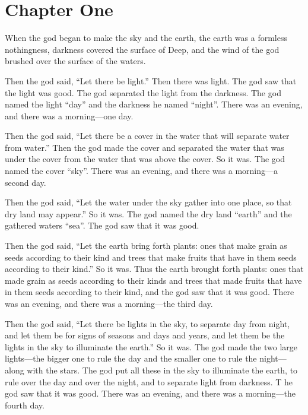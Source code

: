 \chapter*{Chapter One}

When the god began to make the sky and the earth, 
the earth was a formless nothingness, 
darkness covered the surface of Deep,
and the wind of the god brushed over the surface of the waters. 

Then the god said, 
\enquote{Let there be light.} 
Then there was light. 
The god saw that the light was good. 
The god separated the light from the darkness. 
The god named the light \enquote{day} and the darkness he named \enquote{night}. 
There was an evening, and there was a morning---one day.

Then the god said, 
\enquote{Let there be a cover in the water that will separate water from water.} 
Then the god made the cover and separated the water that was under the cover from the water that was above the cover. 
So it was. 
The god named the cover \enquote{sky}. 
There was an evening, and there was a morning---a second day.

Then the god said, 
\enquote{Let the water under the sky gather into one place, so that dry land may appear.} 
So it was. 
The god named the dry land \enquote{earth} and the gathered waters \enquote{sea}. 
The god saw that it was good. 

Then the god said, 
\enquote{Let the earth bring forth plants: 
ones that make grain as seeds according to their kind and 
trees that make fruits that have in them seeds according to their kind.} 
So it was. 
Thus the earth brought forth plants: 
ones that made grain as seeds according to their kinds and 
trees that made fruits that have in them seeds according to their kind, 
and the god saw that it was good. 
There was an evening, and there was a morning---the third day.

Then the god said, 
\enquote{Let there be lights in the sky, 
to separate day from night, and 
let them be for signs of seasons and days and years, 
and let them be the lights in the sky to illuminate the earth.} 
So it was. 
The god made the two large lights---the bigger one to rule the day 
and the smaller one to rule the night---along with the stars. 
The god put all these in the sky to illuminate the earth, 
to rule over the day and over the night, 
and to separate light from darkness. T
he god saw that it was good.
There was an evening, and there was a morning---the fourth day.

